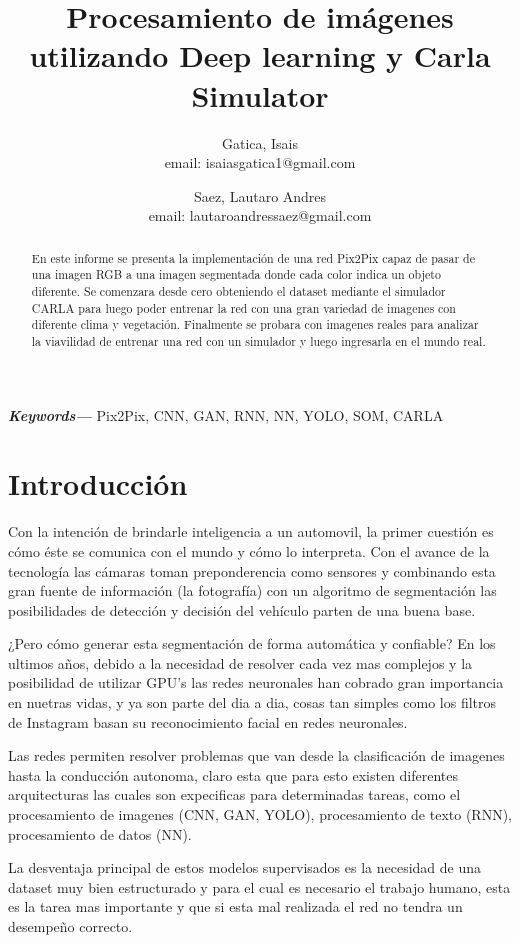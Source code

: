 \documentclass[]{IEEEtran}
\title{Procesamiento de imágenes utilizando Deep learning y Carla 
Simulator}
\author{ 
Gatica, Isais \\ \small{email: isaiasgatica1@gmail.com} \\ \and 
Saez, Lautaro Andres \\ \small{email: lautaroandressaez@gmail.com } }
\date{}
\providecommand{\keywords}[1]
{
  \small	
  \textbf{\textit{Keywords---}} #1
}
\begin{document}
    \maketitle

    \begin{abstract}
        En este informe se presenta la implementación de una red Pix2Pix capaz de pasar de una imagen RGB a 
        una imagen segmentada donde cada color indica un objeto diferente. Se comenzara desde cero obteniendo el 
        dataset mediante el simulador CARLA para luego poder entrenar la red con una gran variedad de imagenes con 
        diferente clima y vegetación. Finalmente se probara con imagenes reales para analizar la viavilidad de entrenar una 
        red con un simulador y luego ingresarla en el mundo real.
    \end{abstract}

    \keywords{Pix2Pix, CNN, GAN, RNN, NN, YOLO, SOM, CARLA}


    \section{Introducción}

    Con la intención de brindarle inteligencia a un automovil, la primer cuestión es cómo éste se comunica con el mundo y cómo lo interpreta.
    Con el avance de la tecnología las cámaras toman preponderencia como sensores y combinando esta gran fuente de información (la fotografía) con un 
    algoritmo de segmentación las posibilidades de detección y decisión del vehículo parten de una buena base. 

    ¿Pero cómo generar esta segmentación de forma automática y confiable? En los ultimos años, debido a la necesidad de resolver cada vez mas complejos y la posibilidad de utilizar GPU's las redes neuronales han cobrado 
    gran importancia en nuetras vidas, y ya son parte del dia a dia, cosas tan simples como los filtros de Instagram basan 
    su reconocimiento facial en redes neuronales. 

    Las redes permiten resolver problemas que van desde la clasificación de imagenes hasta la conducción autonoma, claro esta 
    que para esto existen diferentes arquitecturas las cuales son expecificas para determinadas tareas, como el procesamiento de imagenes (CNN, GAN, YOLO), 
    procesamiento de texto (RNN), procesamiento de datos (NN).

    La desventaja principal de estos modelos supervisados es la necesidad de una dataset muy bien estructurado y para el cual es necesario 
    el trabajo humano, esta es la tarea mas importante y que si esta mal realizada el red no tendra un desempeño correcto.
\end{document}
